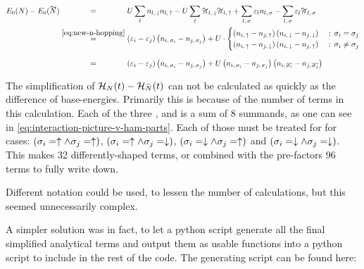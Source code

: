 \begin{equation}
    \label{eq:simplified-base-energy-hopping}
    \begin{split}
        E_0(N)-E_0(\vphantom{N}\smash{\tilde{N}}) 
        &\stackrel{\phantom{\ref{eq:new-n-hopping}}}{=} U\lsum n_{l,\,\down}n_{l,\,\up}-U\lsum \tilde{n}_{l,\,\down}\tilde{n}_{l,\,\up} 
        + \lsum[l,\,\sigma] \epsl n_{l,\,\sigma} - \lsum[l,\,\sigma] \epsl \tilde{n}_{l,\,\sigma}\\
        &\stackrel{\ref{eq:new-n-hopping}}{=} \left(\epsl[i]-\epsl[j]\right)\left(n_{i,\,\sigma_i} - n_{j,\,\sigma_j}\right) +
        U\cdot \begin{cases}
            \left(n_{i,\,\up}-n_{j,\,\up}\right) \left(n_{i,\,\down}-n_{j,\,\down}\right) &\text{ : } \sigma_i = \sigma_j   \\
            \left(n_{i,\,\up}-n_{j,\,\down}\right) \left(n_{i,\,\down}-n_{j,\,\up}\right) &\text{ : } \sigma_i \neq \sigma_j
        \end{cases}\\
        &\stackrel{\phantom{\ref{eq:new-n-hopping}}}{=} \left(\epsl[i]-\epsl[j]\right)\left(n_{i,\,\sigma_i} - n_{j,\,\sigma_j}\right) +
        U \left(n_{i,\,\sigma_i}-n_{j,\,\sigma_j}\right) \left(n_{i,\,\overline{\sigma_i}}-n_{j,\,\overline{\sigma_j}}\right)
    \end{split}
\end{equation}

The simplification of $\HNOft - \HNOft[\vphantom{N}\smash{\tilde{N}}]$ can not be calculated as quickly as the difference of base-energies.
Primarily this is because of the number of terms in this calculation. Each of the three ,  and  is a sum of 8 summands, as one can see in \autoref{eq:interaction-picture-v-ham-parts}.
Each of those must be treated for for cases: $(\sigma_i = \uparrow \land \sigma_j = \uparrow)$, $(\sigma_i = \uparrow \land \sigma_j = \downarrow)$, $(\sigma_i = \downarrow \land \sigma_j = \uparrow)$ and $(\sigma_i = \downarrow \land \sigma_j = \downarrow)$.
This makes 32 differently-shaped terms, or combined with the pre-factors 96 terms to fully write down.

Different notation could be used, to lessen the number of calculations, but this seemed unnecessarily complex.

A simpler solution was in fact, to let a python script generate all the final simplified analytical terms and output them as usable functions into a python script to include in the rest of the code.
The generating script can be found here: 

